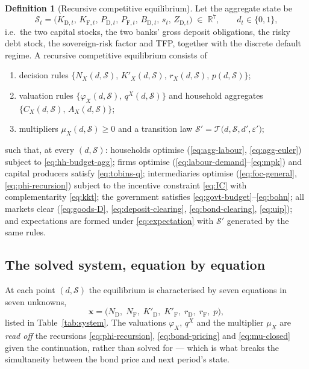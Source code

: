 \documentclass[11pt]{article}
\numberwithin{equation}{section}
\newcommand{\R}{\mathbb{R}}
\newcommand{\D}{\mathrm{D}}
\newcommand{\F}{\mathrm{F}}
\theoremstyle{definition}
\newtheorem{definition}{Definition}
\theoremstyle{plain}
\theoremstyle{remark}
\begin{document}
\begin{definition}[Recursive competitive equilibrium]
\label{def:rce}
Let the aggregate state be
\begin{equation}
\mathcal{S}_t=\bigl(K_{\D,t},\,K_{\F,t},\,P_{\D,t},\,P_{\F,t},\,B_{\D,t},\,s_t,\,Z_{\D,t}\bigr)
\;\in\;\R^{7},
\qquad d_t\in\{0,1\},
\label{eq:state}
\end{equation}
i.e.\ the two capital stocks, the two banks' gross deposit obligations, the risky
debt stock, the sovereign-risk factor and TFP, together with the discrete default
regime. A recursive competitive equilibrium consists of
\begin{enumerate}
\item decision rules
$\bigl\{N_X(d,\mathcal{S}),\,K'_X(d,\mathcal{S}),\,r_X(d,\mathcal{S}),\,p(d,\mathcal{S})\bigr\}$;
\item valuation rules
$\bigl\{\varphi_X(d,\mathcal{S}),\,q^{X}(d,\mathcal{S})\bigr\}$
and household aggregates $\bigl\{C_X(d,\mathcal{S}),\,A_X(d,\mathcal{S})\bigr\}$;
\item multipliers $\mu_X(d,\mathcal{S})\ge0$ and a transition law
$\mathcal{S}'=\mathcal{T}\bigl(d,\mathcal{S},d',\varepsilon'\bigr)$;
\end{enumerate}
such that, at every $(d,\mathcal{S})$: households optimise
(\eqref{eq:agg-labour}, \eqref{eq:agg-euler}) subject to
\eqref{eq:hh-budget-agg}; firms optimise
(\eqref{eq:labour-demand}--\eqref{eq:mpk}) and capital producers satisfy
\eqref{eq:tobins-q}; intermediaries optimise
(\eqref{eq:foc-general}, \eqref{eq:phi-recursion}) subject to the incentive
constraint \eqref{eq:IC} with complementarity \eqref{eq:kkt}; the government
satisfies \eqref{eq:govt-budget}--\eqref{eq:bohn}; all markets clear
(\eqref{eq:goods-D}, \eqref{eq:deposit-clearing}, \eqref{eq:bond-clearing},
\eqref{eq:uip}); and expectations are formed under \eqref{eq:expectation} with
$\mathcal{S}'$ generated by the same rules.
\end{definition}

\subsection{The solved system, equation by equation}
\label{sec:system}

At each point $(d,\mathcal{S})$ the equilibrium is characterised by seven equations
in seven unknowns,
\begin{equation}
\mathbf{x}=\bigl(N_\D,\;N_\F,\;K'_\D,\;K'_\F,\;r_\D,\;r_\F,\;p\bigr),
\label{eq:unknowns}
\end{equation}
listed in Table~\ref{tab:system}. The valuations $\varphi_X$, $q^{X}$ and the
multiplier $\mu_X$ are \emph{read off} the recursions
\eqref{eq:phi-recursion}, \eqref{eq:bond-pricing} and \eqref{eq:mu-closed} given the
continuation, rather than solved for --- which is what breaks the simultaneity
between the bond price and next period's state.
\end{document}

